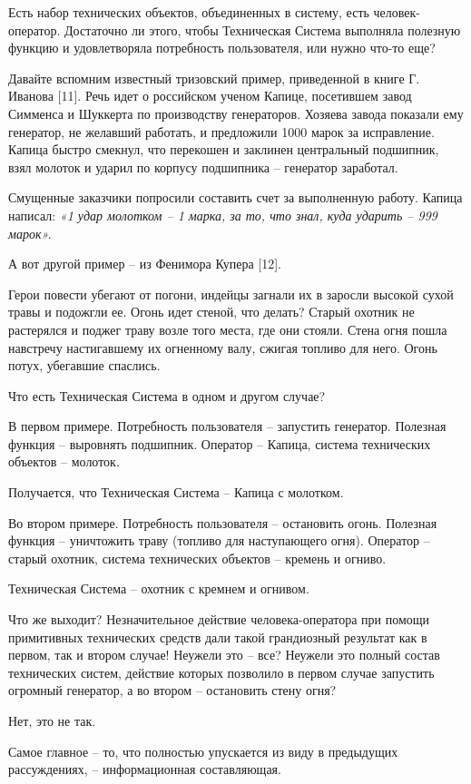\documentclass[11pt,a4paper]{article}
\begin{document}
Есть набор технических объектов, объединенных в систему, есть
человек-оператор. Достаточно ли этого, чтобы Техническая Система выполняла
полезную функцию и удовлетворяла потребность пользователя, или нужно что-то
еще?


Давайте вспомним известный тризовский пример, приведенной в книге Г. Иванова
[11]. Речь идет о российском ученом Капице, посетившем завод Симменса и
Шуккерта по производству генераторов. Хозяева завода показали ему генератор,
не желавший работать, и предложили 1000 марок за исправление. Капица быстро
смекнул, что перекошен и заклинен центральный подшипник, взял молоток и ударил
по корпусу подшипника – генератор заработал.

Смущенные заказчики попросили составить счет за выполненную работу. Капица
написал: \emph{«1 удар молотком – 1 марка, за то, что знал, куда ударить – 999
марок».}


А вот другой пример – из Фенимора Купера [12].

Герои повести убегают от погони, индейцы загнали их в заросли высокой сухой
травы и подожгли ее. Огонь идет стеной, что делать? Старый охотник не
растерялся и поджег траву возле того места, где они стояли. Стена огня пошла
навстречу настигавшему их огненному валу, сжигая топливо для него. Огонь
потух, убегавшие спаслись.

Что есть Техническая Система в одном и другом случае?

В первом примере. Потребность пользователя – запустить генератор. Полезная
функция – выровнять подшипник. Оператор – Капица, система технических объектов
– молоток.

Получается, что Техническая Система – Капица с молотком.

Во втором примере. Потребность пользователя – остановить огонь. Полезная
функция – уничтожить траву (топливо для наступающего огня). Оператор – старый
охотник, система технических объектов – кремень и огниво.

Техническая Система – охотник с кремнем и огнивом.

Что же выходит? Незначительное действие человека-оператора при помощи
примитивных технических средств дали такой грандиозный результат как в первом,
так и втором случае! Неужели это – все? Неужели это полный состав технических
систем, действие которых позволило в первом случае запустить огромный
генератор, а во втором – остановить стену огня?

Нет, это не так.

Самое главное – то, что полностью упускается из виду в предыдущих
рассуждениях, – информационная составляющая.
\end{document}

